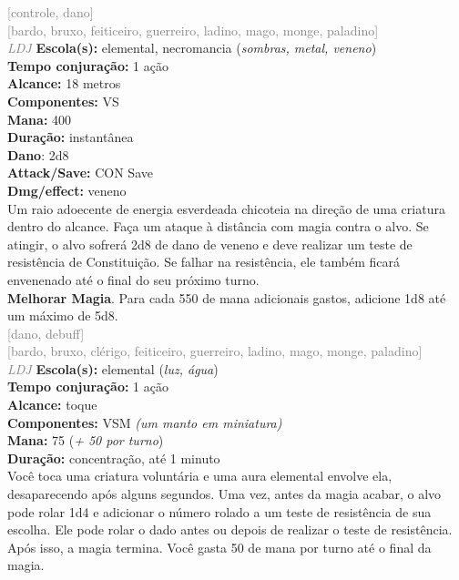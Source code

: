 \documentclass{RPG_Adventure}[2021/10/20]
\begin{document}
{\scriptsize \textcolor{gray}{[controle, dano]\\}}
{\scriptsize \textcolor{gray}{[bardo, bruxo, feiticeiro, guerreiro, ladino, mago, monge, paladino]\\}}
{\tiny \textcolor{gray}{\textit{LDJ}}}
{\small \t \textbf{Escola(s):} elemental, necromancia (\textit{sombras, metal, veneno})\\\t \textbf{Tempo conjuração:} 1 ação\\\t \textbf{Alcance:} 18 metros\\\t \textbf{Componentes:} VS\\\t \textbf{Mana:} 400\\\t \textbf{Duração:} instantânea\\\t \textbf{Dano}: 2d8\\\t \textbf{Attack/Save:} CON Save\\\t \textbf{Dmg/effect:} veneno\\}
{\normalsize Um raio adoecente de energia esverdeada chicoteia na direção de uma criatura dentro do alcance. Faça um ataque à distância com magia contra o alvo. Se atingir, o alvo sofrerá 2d8 de dano de veneno e deve realizar um teste de resistência de Constituição. Se falhar na resistência, ele também ficará envenenado até o final do seu próximo turno.\\\t \textbf{Melhorar Magia}. Para cada 550 de mana adicionais gastos, adicione 1d8 até um máximo de 5d8.\\}
{\scriptsize \textcolor{gray}{[dano, debuff]\\}}
{\scriptsize \textcolor{gray}{[bardo, bruxo, clérigo, feiticeiro, guerreiro, ladino, mago, monge, paladino]\\}}
{\tiny \textcolor{gray}{\textit{LDJ}}}
{\small \t \textbf{Escola(s):} elemental (\textit{luz, água})\\\t \textbf{Tempo conjuração:} 1 ação\\\t \textbf{Alcance:} toque\\\t \textbf{Componentes:} VSM \textit{(um manto em miniatura)}\\\t \textbf{Mana:} 75 (\textit{+ 50 por turno})\\\t \textbf{Duração:} concentração, até 1 minuto\\}
{\normalsize Você toca uma criatura voluntária e uma aura elemental envolve ela, desaparecendo após alguns segundos. Uma vez, antes da magia acabar, o alvo pode rolar 1d4 e adicionar o número rolado a um teste de resistência de sua escolha. Ele pode rolar o dado antes ou depois de realizar o teste de resistência. Após isso, a magia termina. Você gasta 50 de mana por turno até o final da magia.\\}
\end{document}
